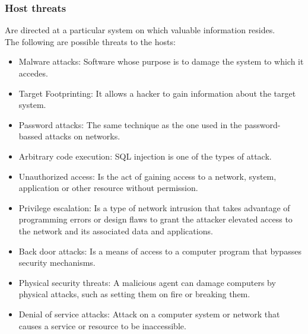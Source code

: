 \subsubsection{Host threats} 

Are directed at a particular system on which valuable information resides.\\
The following are possible threats to the hosts:
\begin{itemize}
	\item Malware attacks: Software whose purpose is to damage the system to which it accedes.
	\item Target Footprinting: It allows a hacker to gain information about the target system.
	\item Password attacks: The same technique as the one used in the password-bassed attacks on networks. 
	\item Arbitrary code execution: SQL injection is one of the types of attack.
	\item Unauthorized access: Is the act of gaining access to a network, system, application or other resource without permission.
	\item Privilege escalation: Is a type of network intrusion that takes advantage of programming errors or design flaws to grant the attacker elevated access to the network and its associated data and applications. 
	\item Back door attacks: Is a means of access to a computer program that bypasses security mechanisms.
	\item Physical security threats: A malicious agent can damage computers by physical attacks, such as setting them on fire or breaking them.
	\item Denial of service attacks: Attack on a computer system or network that causes a service or resource to be inaccessible.
\end{itemize}

